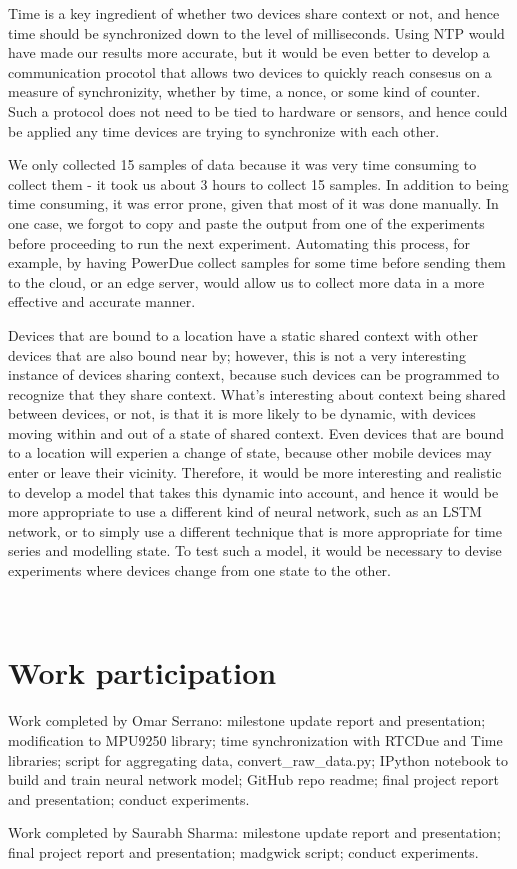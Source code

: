 \documentclass[journal]{IEEEtranTIE}
\begin{document}
Time is a key ingredient of whether two devices share context or not, and hence
time should be synchronized down to the level of milliseconds. Using NTP would
have made our results more accurate, but it would be even better to develop a
communication procotol that allows two devices to quickly reach consesus on a
measure of synchronizity, whether by time, a nonce, or some kind of counter.
Such a protocol does not need to be tied to hardware or sensors, and hence could
be applied any time devices are trying to synchronize with each other.

We only collected 15 samples of data because it was very time consuming to
collect them - it took us about 3 hours to collect 15 samples. In addition to
being time consuming, it was error prone, given that most of it was done
manually. In one case, we forgot to copy and paste the output from one of the
experiments before proceeding to run the next experiment. Automating this
process, for example, by having PowerDue collect samples for some time before
sending them to the cloud, or an edge server, would allow us to collect more
data in a more effective and accurate manner.

Devices that are bound to a location have a static shared context with other
devices that are also bound near by; however, this is not a very interesting
instance of devices sharing context, because such devices can be programmed to
recognize that they share context. What's interesting about context being shared
between devices, or not, is that it is more likely to be dynamic, with devices
moving within and out of a state of shared context. Even devices that are bound
to a location will experien a change of state, because other mobile devices may
enter or leave their vicinity. Therefore, it would be more interesting and
realistic to develop a model that takes this dynamic into account, and hence it
would be more appropriate to use a different kind of neural network, such as an
LSTM network, or to simply use a different technique that is more appropriate
for time series and modelling state. To test such a model, it would be necessary
to devise experiments where devices change from one state to the other.



\ %

\appendix
\section{Work participation}
Work completed by Omar Serrano: milestone update report and presentation;
modification to MPU9250 library; time synchronization with RTCDue and Time
libraries; script for aggregating data, convert\_raw\_data.py; IPython notebook
to build and train neural network model; GitHub repo readme; final project
report and presentation; conduct experiments.

Work completed by Saurabh Sharma: milestone update report and presentation;
final project report and presentation; madgwick script; conduct experiments.
\end{document}
